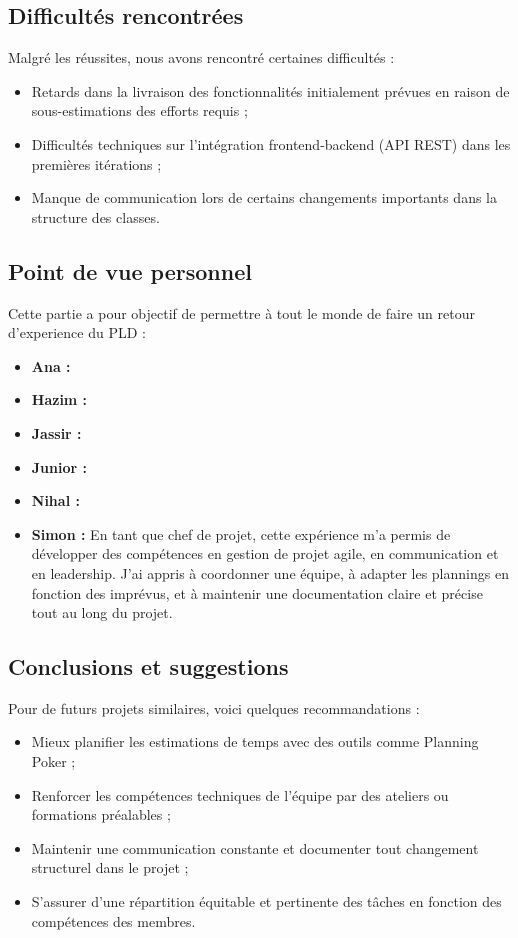 \documentclass[a4paper]{article}
\begin{document}
\subsection{Difficultés rencontrées}
Malgré les réussites, nous avons rencontré certaines difficultés :
\begin{itemize}
    \item Retards dans la livraison des fonctionnalités initialement prévues en raison de sous-estimations des efforts requis ;
    \item Difficultés techniques sur l'intégration frontend-backend (API REST) dans les premières itérations ;
    \item Manque de communication lors de certains changements importants dans la structure des classes.
\end{itemize}

\subsection{Point de vue personnel}
Cette partie a pour objectif de permettre à tout le monde de faire un retour d'experience du PLD :
\begin{itemize}
    \item \textbf{Ana : }
    \item \textbf{Hazim : }
    \item \textbf{Jassir : }
    \item \textbf{Junior : }
    \item \textbf{Nihal : }
    \item \textbf{Simon :} En tant que chef de projet, cette expérience m'a permis de développer des compétences en gestion de projet agile, en communication et en leadership. J'ai appris à coordonner une équipe, à adapter les plannings en fonction des imprévus, et à maintenir une documentation claire et précise tout au long du projet.
\end{itemize}


\subsection{Conclusions et suggestions}
Pour de futurs projets similaires, voici quelques recommandations :
\begin{itemize}
    \item Mieux planifier les estimations de temps avec des outils comme Planning Poker ;
    \item Renforcer les compétences techniques de l'équipe par des ateliers ou formations préalables ;
    \item Maintenir une communication constante et documenter tout changement structurel dans le projet ;
    \item S'assurer d'une répartition équitable et pertinente des tâches en fonction des compétences des membres.
\end{itemize}
\end{document}
